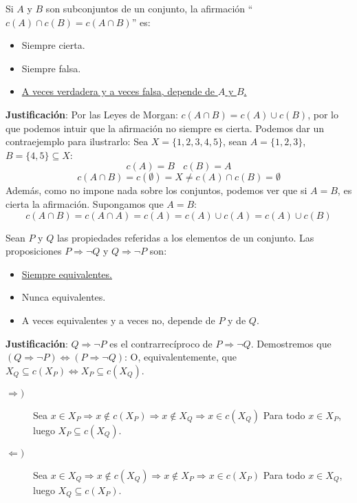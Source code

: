 \begin{ejercicio}
    Si $A$ y $B$ son subconjuntos de un conjunto, la afirmación \newline ``$c(A) \cap c(B) = c(A \cap B)$'' es:
    \begin{itemize}
        \item Siempre cierta.
        \item Siempre falsa.
        \item \underline{A veces verdadera y a veces falsa, depende de $A$ y $B$.}
    \end{itemize}

    \noindent
    \textbf{Justificación}:
    Por las Leyes de Morgan: $c(A \cap B) = c(A) \cup c(B)$, por lo que podemos intuir que la afirmación no siempre es cierta. Podemos dar un contraejemplo para ilustrarlo:\newline
    Sea $X = \{1,2,3,4,5\}$, sean $A = \{1,2,3\}$, $B = \{4,5\} \subseteq X$:
    $$c(A) = B~~~~c(B) = A$$
    $$c(A \cap B) = c(\emptyset) = X \neq c(A) \cap c(B) = \emptyset$$
    Además, como no impone nada sobre los conjuntos, podemos ver que si $A = B$, es cierta la afirmación. Supongamos que $A = B$:
    $$c(A \cap B) = c(A \cap A) = c(A) = c(A) \cup c(A) = c(A) \cup c(B)$$

\end{ejercicio}

\newpage
\begin{ejercicio}
    Sean $P$ y $Q$ las propiedades referidas a los elementos de un conjunto. Las proposiciones $P \Rightarrow \neg Q$ y $Q \Rightarrow \neg P$ son:
    \begin{itemize}
        \item \underline{Siempre equivalentes.}
        \item Nunca equivalentes.
        \item A veces equivalentes y a veces no, depende de $P$ y de $Q$.
    \end{itemize}

    \noindent
    \textbf{Justificación}:
    $Q \Rightarrow \neg P$ es el contrarrecíproco de $P \Rightarrow \neg Q$.\newline
    Demostremos que $(Q \Rightarrow \neg P) \Leftrightarrow (P \Rightarrow \neg Q)$:\newline
    O, equivalentemente, que $X_Q \subseteq c(X_P) \Leftrightarrow X_P \subseteq c(X_Q)$.
    \begin{description}
        \item [$\Rightarrow)$]
            Sea $ x \in X_P \Rightarrow x \notin c(X_P) \Rightarrow x \notin X_Q \Rightarrow x \in c(X_Q)$\newline
            Para todo $x \in X_P$, luego $X_P \subseteq c(X_Q)$.
        \item [$\Leftarrow)$]
            Sea $ x \in X_Q \Rightarrow x \notin c(X_Q) \Rightarrow x \notin X_P \Rightarrow x \in c(X_P)$\newline
            Para todo $x \in X_Q$, luego $X_Q \subseteq c(X_P)$.
    \end{description}
\end{ejercicio}

